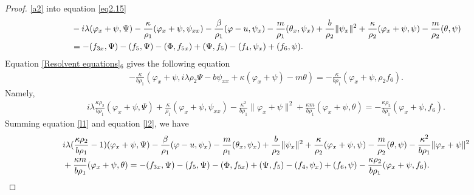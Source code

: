 \documentclass[11pt,reqno]{article}
\begin{document}
\begin{proof}
  	\eqref{a2} into equation \eqref{eq2.15}
  	\begin{align}\label{l1}
  		&-i \lambda (\varphi_x + \psi, \Psi) -\frac{\kappa}{\rho_{1}}(\varphi_{x} + \psi, \psi_{xx}) - \frac{\beta}{\rho_{1}}(\varphi - u, \psi_{x}) - \frac{m}{\rho_{1}}(\theta_{x}, \psi_{x}) +\frac{b}{\rho_{2}}\|\psi_{x}\|^{2} + \frac{\kappa}{\rho_{2}}(\varphi_{x} + \psi, \psi) - \frac{m}{\rho_{2}}(\theta, \psi)\notag\\
  		&= -(f_{3 x}, \Psi) - (f_5, \Psi) - (\Phi, f_{5 x}) + (\Psi, f_5) - (f_{4}, \psi_{x}) + (f_{6}, \psi).
  	\end{align}
  	Equation \eqref{Resolvent equations}$_6$ gives the following equation
  	\begin{align*}
  		-\frac{\kappa}{b \rho_1} ( \varphi_x + \psi, i \lambda \rho_2 \Psi - b \psi_{xx} + \kappa (\varphi_x + \psi) - m \theta ) = -\frac{\kappa}{b \rho_1} ( \varphi_x + \psi, \rho_2 f_6).
  	\end{align*}
  	Namely,
  	\begin{align}\label{l2}
  		i \lambda \frac{\kappa \rho_2}{b \rho_1} ( \varphi_x + \psi, \Psi ) + \frac{\kappa}{\rho_1} ( \varphi_x + \psi, \psi_{xx}) - \frac{\kappa ^2}{b \rho_1} \| \varphi_x + \psi \|^2
  		+ \frac{\kappa m}{b \rho_1} ( \varphi_x + \psi, \theta ) = -\frac{\kappa \rho_2}{b \rho_1} ( \varphi_x + \psi, f_6).
  	\end{align}
  	Summing equation \eqref{l1} and equation \eqref{l2}, we have
  	\begin{align}\label{l3}
  		&i \lambda (\frac{\kappa \rho_2}{b \rho_1} - 1) (\varphi_x + \psi, \Psi)  - \frac{\beta}{\rho_{1}}(\varphi - u, \psi_{x}) - \frac{m}{\rho_{1}}(\theta_{x}, \psi_{x}) +\frac{b}{\rho_{2}}\|\psi_{x}\|^{2} + \frac{\kappa}{\rho_{2}}(\varphi_{x} + \psi, \psi) - \frac{m}{\rho_{2}}(\theta, \psi) - \frac{\kappa ^2}{b \rho_1} \| \varphi_x + \psi \|^2 \notag\\
  		& + \frac{\kappa m}{b \rho_1} ( \varphi_x + \psi, \theta )
  		= -(f_{3 x}, \Psi) - (f_5, \Psi) - (\Phi, f_{5 x}) + (\Psi, f_5) - (f_{4}, \psi_{x}) + (f_{6}, \psi) -\frac{\kappa \rho_2}{b \rho_1} ( \varphi_x + \psi, f_6).
  	\end{align}

\end{proof}
\end{document}
